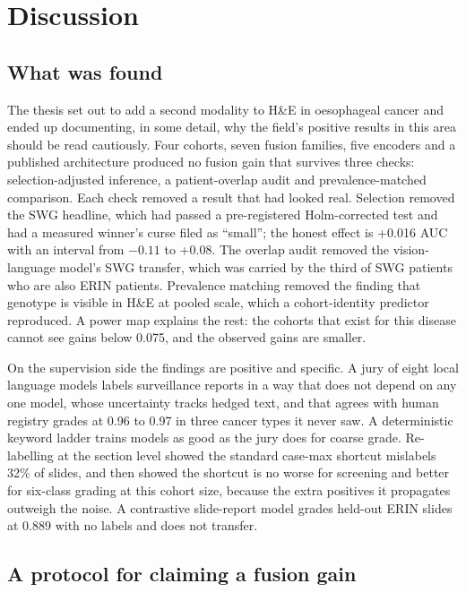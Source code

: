 \chapter{Discussion}
\label{ch:discussion}

\section{What was found}

The thesis set out to add a second modality to H\&E in oesophageal cancer and ended up documenting, in some detail, why the field's positive results in this area should be read cautiously. Four cohorts, seven fusion families, five encoders and a published architecture produced no fusion gain that survives three checks: selection-adjusted inference, a patient-overlap audit and prevalence-matched comparison. Each check removed a result that had looked real. Selection removed the SWG headline, which had passed a pre-registered Holm-corrected test and had a measured winner's curse filed as ``small''; the honest effect is +0.016 AUC with an interval from $-0.11$ to +0.08. The overlap audit removed the vision-language model's SWG transfer, which was carried by the third of SWG patients who are also ERIN patients. Prevalence matching removed the finding that genotype is visible in H\&E at pooled scale, which a cohort-identity predictor reproduced. A power map explains the rest: the cohorts that exist for this disease cannot see gains below 0.075, and the observed gains are smaller.

On the supervision side the findings are positive and specific. A jury of eight local language models labels surveillance reports in a way that does not depend on any one model, whose uncertainty tracks hedged text, and that agrees with human registry grades at 0.96 to 0.97 in three cancer types it never saw. A deterministic keyword ladder trains models as good as the jury does for coarse grade. Re-labelling at the section level showed the standard case-max shortcut mislabels 32\% of slides, and then showed the shortcut is no worse for screening and better for six-class grading at this cohort size, because the extra positives it propagates outweigh the noise. A contrastive slide-report model grades held-out ERIN slides at 0.889 with no labels and does not transfer.

\section{A protocol for claiming a fusion gain}
\label{sec:protocol}


